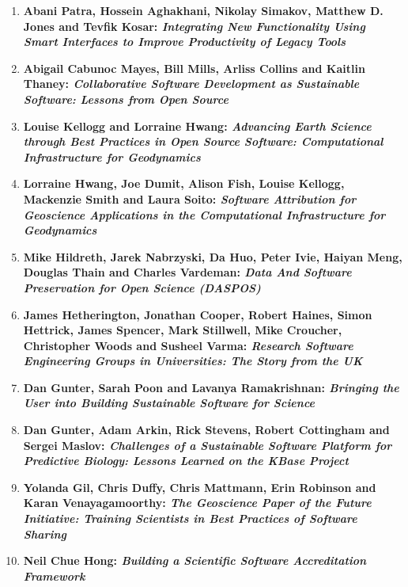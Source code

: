 \documentclass[11pt, oneside]{amsart}
\begin{document}
\begin{enumerate}
\item \textbf{Abani Patra, Hossein Aghakhani, Nikolay Simakov, Matthew D. Jones
and Tevfik Kosar: \textit{Integrating New Functionality Using Smart Interfaces to
Improve Productivity of Legacy Tools}}

\item \textbf{Abigail Cabunoc Mayes, Bill Mills, Arliss Collins and Kaitlin
Thaney: \textit{Collaborative Software Development as Sustainable Software: Lessons
from Open Source}}

\item \textbf{Louise Kellogg and Lorraine Hwang: \textit{Advancing Earth Science
through Best Practices in Open Source Software: Computational Infrastructure
for Geodynamics}}

\item \textbf{Lorraine Hwang, Joe Dumit, Alison Fish, Louise Kellogg, Mackenzie
Smith and Laura Soito: \textit{Software Attribution for Geoscience Applications in the
Computational Infrastructure for Geodynamics}}

\item \textbf{Mike Hildreth, Jarek Nabrzyski, Da Huo, Peter Ivie, Haiyan Meng,
Douglas Thain and Charles Vardeman: \textit{Data And Software Preservation for Open
Science (DASPOS)}}

\item \textbf{James Hetherington, Jonathan Cooper, Robert Haines, Simon
Hettrick, James Spencer, Mark Stillwell, Mike Croucher, Christopher Woods and
Susheel Varma: \textit{Research Software Engineering Groups in Universities: The Story
from the UK}}

\item \textbf{Dan Gunter, Sarah Poon and Lavanya Ramakrishnan: \textit{Bringing the
User into Building Sustainable Software for Science}}

\item \textbf{Dan Gunter, Adam Arkin, Rick Stevens, Robert Cottingham and
Sergei Maslov: \textit{Challenges of a Sustainable Software Platform for Predictive
Biology: Lessons Learned on the KBase Project}}

\item \textbf{Yolanda Gil, Chris Duffy, Chris Mattmann, Erin Robinson and Karan
Venayagamoorthy: \textit{The Geoscience Paper of the Future Initiative: Training
Scientists in Best Practices of Software Sharing}}

\item \textbf{Neil Chue Hong: \textit{Building a Scientific Software Accreditation
Framework}}


\end{enumerate}
\end{document}
